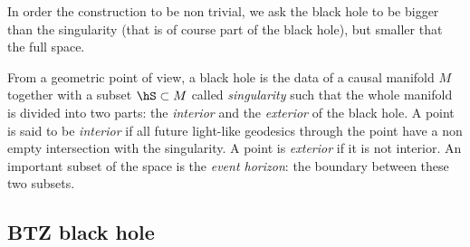 

In order the construction to be non trivial, we ask the black hole to be bigger than the singularity (that is of course part of the black hole), but smaller that the full space.


From a geometric point of view, a black hole is the data of a causal manifold $M$ together with a subset $\hS \subset M$ called \emph{singularity} such that the whole manifold is divided into two parts: the \emph{interior} and the \emph{exterior} of the black hole. A point is said to be \emph{interior} if all future light-like geodesics through the point have a non empty intersection with the singularity. A point is \emph{exterior} if it is not interior. An important subset of the space is the \emph{event horizon}: the boundary between these two subsets.

\subsection{BTZ black hole}		

